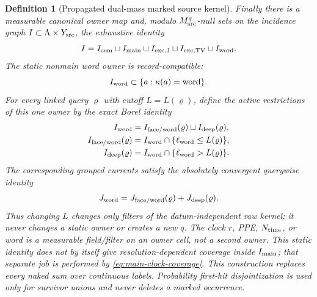 \documentclass[11pt]{article}
\newtheorem{definition}[theorem]{Definition}
\begin{document}
\begin{definition}[Propagated dual-mass marked source kernel]
Finally there is a measurable canonical owner map and, modulo
$M_{\rm src}^{q}$-null sets on the incidence graph
$I\subset\Lambda\times Y_{\rm src}$, the exhaustive identity
\begin{equation}
\label{eq:exhaustive-source-owner-partition}
 I=I_{\rm cem}\sqcup I_{\rm main}\sqcup
 I_{\rm exc,J}\sqcup I_{\rm exc,TV}\sqcup
 I_{\rm word}.
\end{equation}
The static nonmain word owner is record-compatible:
\begin{equation}
\label{eq:nonmain-word-handler-record-compatibility}
 I_{\rm word}\subset\{a:\kappa(a)={\rm word}\}.
\end{equation}
For every linked query $\varrho$ with cutoff $L=L(\varrho)$, define the
active restrictions of this one owner by the exact Borel identity
\begin{equation}
\label{eq:nonmain-word-query-coverage}
\begin{aligned}
 I_{\rm word}
 &=I_{\rm face/word}(\varrho)\sqcup I_{\rm deep}(\varrho),\\
 I_{\rm face/word}(\varrho)
 &=I_{\rm word}\cap\{\ell_{\rm word}\le L(\varrho)\},\\
 I_{\rm deep}(\varrho)
 &=I_{\rm word}\cap\{\ell_{\rm word}>L(\varrho)\}.
\end{aligned}
\end{equation}
The corresponding grouped currents satisfy the absolutely convergent
querywise identity
\begin{equation}
\label{eq:nonmain-word-query-current-identity}
 J_{\rm word}=J_{\rm face/word}(\varrho)+J_{\rm deep}(\varrho).
\end{equation}
Thus changing $L$ changes only filters of the datum-independent raw kernel;
it never changes a static owner or creates a new $q$.
The clock $r$, PPE, $N_{\rm time}$, or word is a measurable field/filter on
an owner cell, not a second owner.  This static identity does not by itself
give resolution-dependent coverage inside $I_{\rm main}$; that separate job
is performed by \eqref{eq:main-clock-coverage}.  This construction replaces every
naked sum over continuous labels.  Probability first-hit disjointization is
used only for survivor unions and never deletes a marked occurrence.
\end{definition}
\end{document}
